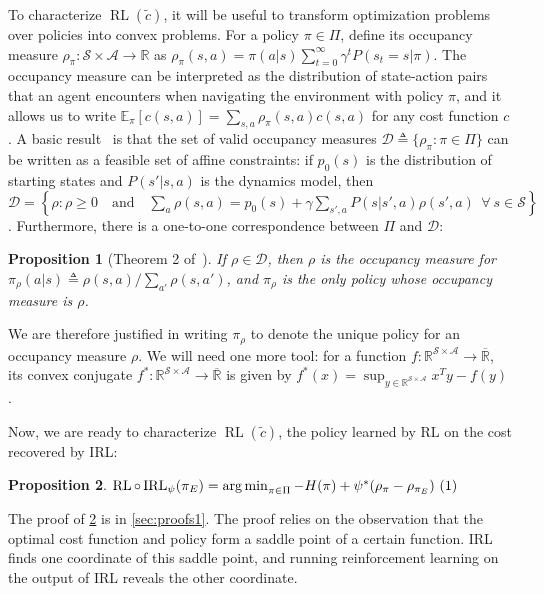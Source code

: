\documentclass{article}
\newcommand\inlineeqno{\stepcounter{equation}\ (\theequation)}
\newtheorem{proposition}{Proposition}[section]
\newcommand\bbR{\ensuremath{\mathbb{R}}} %
\newcommand\extR{\ensuremath{\overline{\mathbb{R}}}}
\newcommand\allC{\ensuremath{\mathbb{R}^{\mathcal{S}\times\mathcal{A}}}}
\DeclareMathOperator*{\argmin}{arg\,min}
\newcommand{\1}{\mathbb{I}} %
\DeclareMathOperator{\rl}{RL}
\DeclareMathOperator{\irl}{IRL} %
\begin{document}
To characterize $\rl(\tilde c)$, it will be useful to transform optimization problems over policies into convex problems.
For a policy $\pi\in\Pi$, define its occupancy measure $\rho_\pi : \mathcal{S}\times\mathcal{A}\rightarrow\bbR$ as $\rho_\pi(s,a) = \pi(a|s) \sum_{t=0}^\infty \gamma^t P(s_t=s|\pi)$.
The occupancy measure can be interpreted as the distribution of state-action pairs that an agent encounters when navigating the environment with policy $\pi$, and it allows us to write $\mathbb{E}_\pi[c(s,a)] = \sum_{s,a}\rho_\pi(s,a)c(s,a)$ for any cost function $c$.
A basic result~\citep{puterman2014markov} is that the set of valid occupancy measures $\mathcal{D} \triangleq \{\rho_\pi : \pi \in \Pi \}$ can be written as a feasible set of affine constraints: if $p_0(s)$ is the distribution of starting states and $P(s'|s,a)$ is the dynamics model, then
$
\mathcal{D} = \left\{\rho : \rho \geq 0\quad  \mathrm{and}\quad \sum_a \rho(s,a) = p_0(s) + \gamma \sum_{s', a}P(s|s',a)\rho(s',a)\ \ \forall \ s \in \mathcal{S}
\right\}
$. Furthermore, there is a one-to-one correspondence between $\Pi$ and $\mathcal{D}$:
\begin{proposition}[Theorem 2 of~\citet{syed2008apprenticeship}]
\label{syedthm2}
If $\rho \in \mathcal{D}$, then $\rho$ is the occupancy measure for $\pi_\rho(a|s) \triangleq \rho(s,a)/\sum_{a'} \rho(s,a')$, and $\pi_\rho$ is the only policy whose occupancy measure is $\rho$.%

\end{proposition}
We are therefore justified in writing $\pi_\rho$ to denote the unique policy for an occupancy measure $\rho$. 
We will need one  more tool: for a function $f : \allC \rightarrow \extR$, its convex conjugate $f^* : \allC \rightarrow \extR$ is given by $f^*(x) = \sup_{y \in \allC} x^Ty - f(y)$.

Now, we are ready to characterize $\rl(\tilde c)$, the policy learned by RL on the cost recovered by IRL:
\begin{proposition}\label{conversion}
$\rl \circ \irl_{\psi} (\pi_E) = \argmin_{\pi\in\Pi} -H(\pi) + \psi^*(\rho_\pi - \rho_{\pi_E}) \hfill \inlineeqno$
\end{proposition}
The proof of \cref{conversion} is in \cref{sec:proofs1}. The proof relies on the observation that the optimal cost function and policy form a saddle point of a certain function. IRL finds one coordinate of this saddle point, and running reinforcement learning on the output of IRL reveals the other coordinate.
\end{document}
